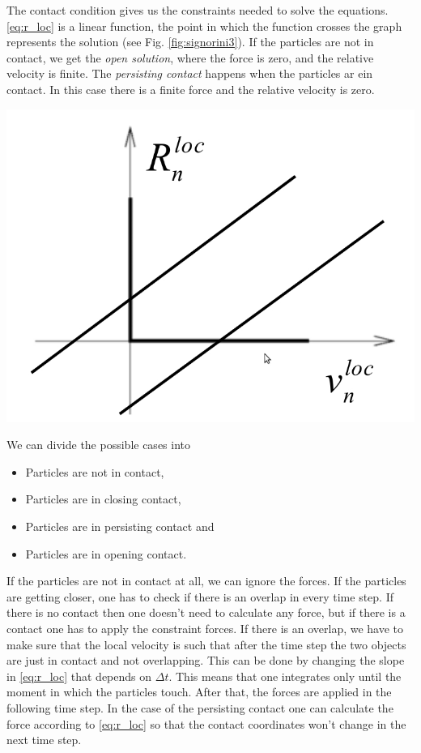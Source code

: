 \noindent
\begin{minipage}{\textwidth}
\begin{minipage}{0.48\textwidth}
The contact condition gives us the constraints needed to solve the equations. \eqref{eq:r_loc} is a linear function, the point in which the function crosses the graph represents the solution (see Fig. \ref{fig:signorini3}). If the particles are not in contact, we get the \emph{open solution}, where the force is zero, and the relative velocity is finite. The \emph{persisting contact} happens when the particles ar ein contact. In this case there is a finite force  and the relative velocity is zero.
\end{minipage}
\hfill
\begin{minipage}{.5\textwidth}
  \centering
  \includegraphics[width=.85\textwidth]{pics/contact_dynamics1.jpeg}
  \label{fig:signorini3}
\end{minipage}
\end{minipage}
\vspace{0.1cm}

We can divide the possible cases into
\begin{itemize}
\item Particles are not in contact,
\item Particles are in closing contact,
\item Particles are in persisting contact and
\item Particles are in opening contact.
\end{itemize}


If the particles are not in contact at all, we can ignore the forces. If the particles are getting closer, one has to check if there is an overlap in every time step. If there is no contact then one doesn't need to calculate any force, but if there is a contact one has to apply the constraint forces. If there is an overlap, we have to make sure that the local velocity is such that after the time step the two objects are just in contact and not overlapping. This can be done by changing the slope in \eqref{eq:r_loc} that depends on $\Delta t$. This means that one integrates only until the moment in which the particles touch. After that, the forces are applied in the following time step. In the case of the persisting contact one can calculate the force according to \eqref{eq:r_loc} so that the contact coordinates won't change in the next time step.



